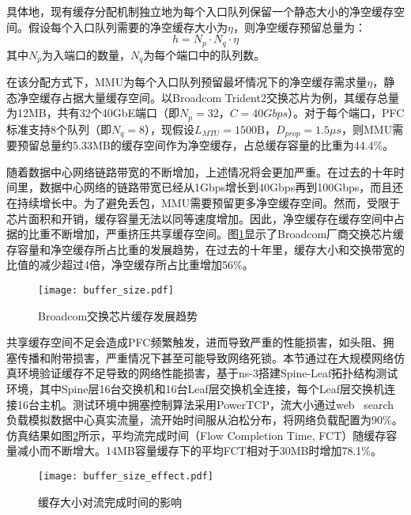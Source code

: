 具体地，现有缓存分配机制独立地为每个入口队列保留一个静态大小的净空缓存空间。假设每个入口队列需要的净空缓存大小为$\eta$，则净空缓存预留总量为：
\begin{equation}
  h = N_p \cdot N_q \cdot \eta
  \label{eqn:c3:total headroom}
\end{equation}
\noindent 其中$N_p$为入端口的数量，$N_q$为每个端口中的队列数。

在该分配方式下，MMU为每个入口队列预留最坏情况下的净空缓存需求量$\eta$，静态净空缓存占据大量缓存空间。以Broadcom Trident2交换芯片为例，其缓存总量为12MB，共有32个40GbE端口（即$N_p=32$，$C=40Gbps$）。对于每个端口，PFC标准支持8个队列（即$N_q=8$），现假设$L_{MTU}=\text{1500B}$，$D_{prop}=1.5μs$，则MMU需要预留总量约5.33MB的缓存空间作为净空缓存，占总缓存容量的比重为44.4\%。

随着数据中心网络链路带宽的不断增加，上述情况将会更加严重。在过去的十年时间里，数据中心网络的链路带宽已经从1Gbps增长到40Gbps再到100Gbps\cite{SIGCOMM19HPCC,SIGCOMM15Jupiter}，而且还在持续增长中。为了避免丢包，MMU需要预留更多净空缓存空间。然而，受限于芯片面积和开销，缓存容量无法以同等速度增加\cite{INFOCOM20BCC,ICNP21FlashPass,NSDI22BFC}。因此，净空缓存在缓存空间中占据的比重不断增加，严重挤压共享缓存空间。图\ref{c3:s2:ss1:fig:broadcom asic buffer size}显示了Broadcom厂商交换芯片缓存容量和净空缓存所占比重的发展趋势，在过去的十年里，缓存大小和交换带宽的比值的减少超过4倍，净空缓存所占比重增加56\%。

\begin{figure}[H]
  \centering
  \texttt{[image: buffer\_size.pdf]}
  \caption{Broadcom交换芯片缓存发展趋势}
  \label{c3:s2:ss1:fig:broadcom asic buffer size}
\end{figure}

共享缓存空间不足会造成PFC频繁触发，进而导致严重的性能损害，如头阻、拥塞传播和附带损害，严重情况下甚至可能导致网络死锁。本节通过在大规模网络仿真环境验证缓存不足导致的网络性能损害，基于ns-3搭建Spine-Leaf拓扑结构测试环境，其中Spine层16台交换机和16台Leaf层交换机全连接，每个Leaf层交换机连接16台主机。测试环境中拥塞控制算法采用PowerTCP\cite{NSDI22PowerTCP}，流大小通过web \ search负载\cite{SIGCOMM10DCTCP}模拟数据中心真实流量，流开始时间服从泊松分布，将网络负载配置为90\%。仿真结果如图\ref{c3:s2:ss1:fig:buffer size effect}所示，平均流完成时间（Flow Completion Time, FCT）随缓存容量减小而不断增大。14MB容量缓存下的平均FCT相对于30MB时增加78.1\%。

\begin{figure}[H]
  \centering
  \texttt{[image: buffer\_size\_effect.pdf]}
  \caption{缓存大小对流完成时间的影响}
  \label{c3:s2:ss1:fig:buffer size effect}
\end{figure}

